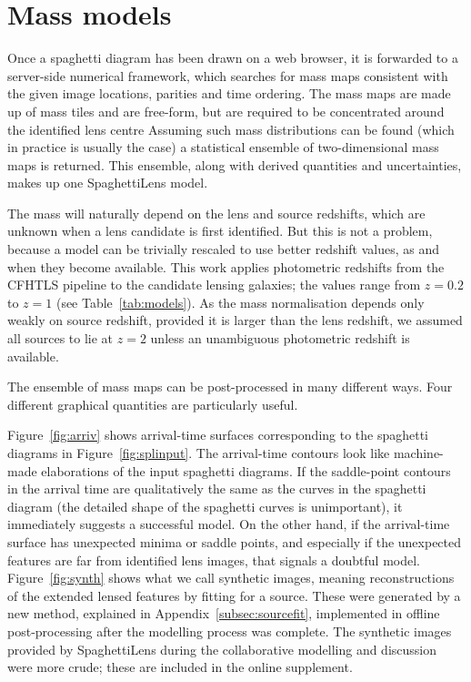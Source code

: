 \section{Mass models}\label{sec:massmodels}

Once a spaghetti diagram has been drawn on a web browser, it is
forwarded to a server-side numerical framework, which searches for
mass maps consistent with the given image locations, parities and time
ordering.  The mass maps are made up of mass tiles and are free-form,
but are required to be concentrated around the identified lens centre
\citep[see][for the precise formulation of the search
  problem.]{2014MNRAS.445.2181C} Assuming such mass distributions can
be found (which in practice is usually the case) a statistical
ensemble of two-dimensional mass maps is returned.  This ensemble,
along with derived quantities and uncertainties, makes up one
SpaghettiLens model.

The mass will naturally depend on the lens and source redshifts, which
are unknown when a lens candidate is first identified.  But this is
not a problem, because a model can be trivially rescaled to use better
redshift values, as and when they become available.  This work applies
photometric redshifts from the CFHTLS pipeline to the candidate
lensing galaxies; the values range from $z=0.2$ to $z=1$ (see
Table~\ref{tab:models}).  As the mass normalisation depends only weakly
on source redshift, provided it is larger than the lens redshift,
we assumed all sources to lie at $z=2$ unless an unambiguous photometric
redshift is available.

The ensemble of mass maps can be post-processed in many different
ways.  Four different graphical quantities are particularly useful.

Figure~\ref{fig:arriv} shows arrival-time surfaces corresponding to
the spaghetti diagrams in Figure~\ref{fig:splinput}.  The arrival-time
contours look like machine-made elaborations of the input spaghetti
diagrams.  If the saddle-point contours in the arrival time are
qualitatively the same as the curves in the spaghetti diagram (the
detailed shape of the spaghetti curves is unimportant), it immediately
suggests a successful model.  On the other hand, if the arrival-time
surface has unexpected minima or saddle points, and especially if the
unexpected features are far from identified lens images, that signals
a doubtful model.  Figure~\ref{fig:synth} shows what we call synthetic
images, meaning reconstructions of the extended lensed features by
fitting for a source.  These were generated by a new method, explained
in Appendix~\ref{subsec:sourcefit}, implemented in offline
post-processing after the modelling process was complete.  The
synthetic images provided by SpaghettiLens during the collaborative
modelling and discussion were more crude; these are included in the
online supplement.

